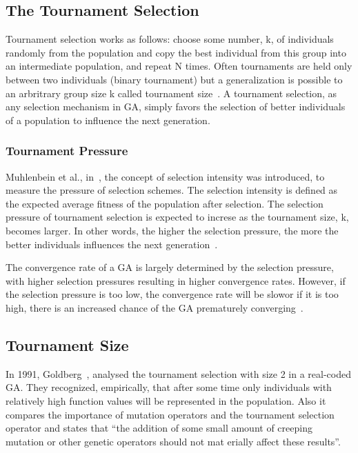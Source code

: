\subsection{The Tournament Selection}\label{sec:background:tournament_selection} 

Tournament selection works as follows: choose some number, k, of individuals randomly from the population and copy the best individual from this group into an intermediate population, and repeat N times. Often tournaments are held only between two individuals (binary tournament) but a generalization is possible to an arbritrary group size k called tournament size~\cite{blickle1995mathematical}. A tournament selection, as any selection mechanism in GA, simply favors the selection of better individuals of a population to influence the next generation. 



\subsubsection{Tournament Pressure}\label{sec:background:tournament_pressure} 
Muhlenbein et al., in~\cite{muhlenbein1993predictive}, the concept of selection intensity was introduced, to measure the pressure of selection schemes. The selection intensity is defined as the expected average fitness of the population after selection. The selection pressure of tournament selection is expected to increse as the tournament size, k, becomes larger. In other words, the higher the selection pressure, the more the better individuals influences the next generation~\cite{miller1995genetic}.  

The convergence rate of a GA is largely determined by the selection pressure, with higher selection pressures resulting in higher convergence rates. However, if the selection pressure is too low, the convergence rate will be slowor if it is too high, there is an increased chance of the GA prematurely converging~\cite{miller1995genetic}.  

\subsection{Tournament Size}\label{sec:background:tournament_size} 

In 1991, Goldberg~\cite{goldberg1991real}, analysed the tournament selection with size 2 in a real-coded GA. They recognized, empirically, that after some time only individuals with relatively high function values will be represented in the population. Also it compares the importance of mutation operators and the tournament selection operator and states that ``the addition of some small amount of creeping mutation or other genetic operators should not mat erially affect these results''.

